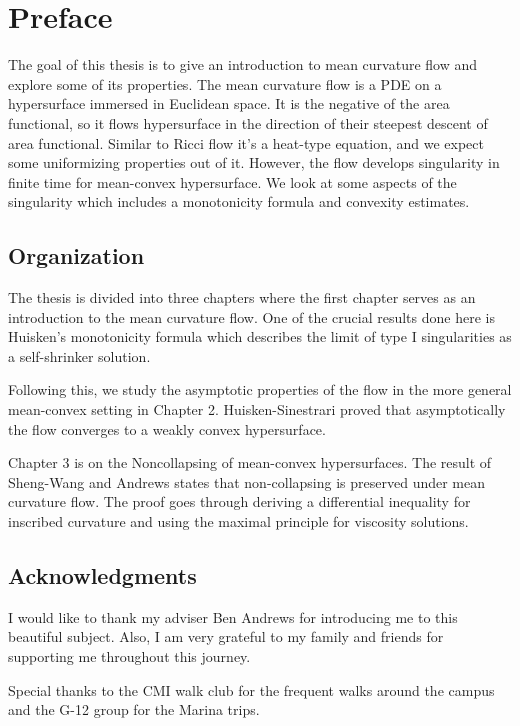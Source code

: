 \chapter{Preface}

The goal of this thesis is to give an introduction to mean curvature flow and explore some of its properties. The mean curvature flow is a PDE on a hypersurface immersed in Euclidean space. It is the negative of the area functional, so it flows hypersurface in the direction of their steepest descent of area functional. Similar to Ricci flow it's a heat-type equation, and we expect some uniformizing properties out of it. However, the flow develops singularity in finite time for mean-convex hypersurface. We look at some aspects of the singularity which includes a monotonicity formula and convexity estimates.  %


\section*{Organization}
      
      The thesis is divided into three chapters where the first chapter serves as an introduction to the mean curvature flow. One of the crucial results done here is Huisken's monotonicity formula which describes the limit of type I singularities as a self-shrinker solution.  
      
      Following this, we study the asymptotic properties of the flow in the more general mean-convex setting in Chapter 2. Huisken-Sinestrari proved that asymptotically the flow converges to a weakly convex hypersurface.
      
      Chapter 3 is on the Noncollapsing of mean-convex hypersurfaces. The result of Sheng-Wang and Andrews states that non-collapsing is preserved under mean curvature flow. The proof goes through deriving a differential inequality for inscribed curvature and using the maximal principle for viscosity solutions. 

\section*{Acknowledgments}

I would like to thank my adviser Ben Andrews for introducing me to this beautiful subject. Also, I am very grateful to my family and friends for supporting me throughout this journey.

Special thanks to the CMI walk club for the frequent walks around the campus and the G-12 group for the Marina trips. 